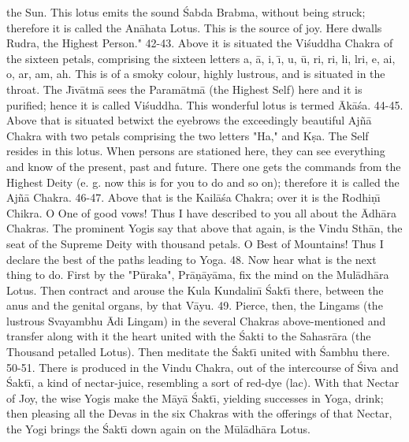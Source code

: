the Sun. This lotus emits the sound \'Sabda Brabma, without being struck; therefore it is called the An\=ahata Lotus. This is the source of joy. Here dwalls Rudra, the Highest Person."
42-43. Above it is situated the Vi\'suddha Chakra of the sixteen petals, comprising the sixteen letters a, \=a, i, \={\i}, u, \=u, ri, ri, li, lri, e, ai, o, ar, am, ah. This is of a smoky colour, highly lustrous, and is situated in the throat. The J\={\i}v\=atm\=a sees the Param\=atm\=a (the Highest Self) here and it is purified; hence it is called Vi\'suddha. This wonderful lotus is termed \=Ak\=a\'sa.
44-45. Above that is situated betwixt the eyebrows the exceedingly beautiful Aj\~n\=a Chakra with two petals comprising the two letters "Ha," and K\d{s}a. The Self resides in this lotus. When persons are stationed here, they can see everything and know of the present, past and future. There one gets the commands from the Highest Deity (e. g. now this is for you to do and so on); therefore it is called the Aj\~n\=a Chakra.
46-47. Above that is the Kail\=a\'sa Chakra; over it is the Rodhi\d{n}\={\i} Chikra. O One of good vows! Thus I have described to you all about the \=Adh\=ara Chakras. The prominent Yogis say that above that again, is the Vindu Sth\=an, the seat of the Supreme Deity with thousand petals. O Best of Mountains! Thus I declare the best of the paths leading to Yoga.
48. Now hear what is the next thing to do. First by the "P\=uraka", Pr\=a\d{n}\=ay\=ama, fix the mind on the Mul\=adh\=ara Lotus. Then contract and arouse the Kula Kundalin\={\i} \'Sakt\={\i} there, between the anus and the genital organs, by that V\=ayu.
49. Pierce, then, the Lingams (the lustrous Svayambhu \=Adi Lingam) in the several Chakras above-mentioned and transfer along with it the heart united with the \'Sakti to the Sahasr\=ara (the Thousand petalled Lotus). Then meditate the \'Sakt\={\i} united with \'Sambhu there.
50-51. There is produced in the Vindu Chakra, out of the intercourse of \'Siva and \'Sakt\={\i}, a kind of nectar-juice, resembling a sort of red-dye (lac). With that Nectar of Joy, the wise Yogis make the M\=ay\=a \'Sakt\={\i}, yielding successes in Yoga, drink; then pleasing all the Devas in the six Chakras with the offerings of that Nectar, the Yogi brings the \'Sakt\={\i} down again on the M\=ul\=adh\=ara Lotus.

